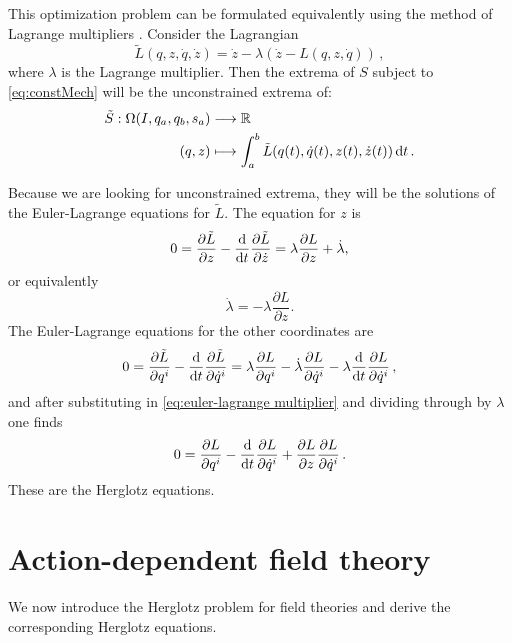 \documentclass[../main.tex]{subfiles}
\begin{document}
This optimization problem can be formulated equivalently using the method of Lagrange multipliers \cite{de_leon_constrained_2021}. Consider the Lagrangian
$$
 \tilde{L}(q,z,\dot q,\dot z)=\dot{z}-\lambda(\dot{z}-L(q,z,\dot q))\,,
$$
where $\lambda$ is the Lagrange multiplier. Then the extrema of \(S\) subject to \cref{eq:constMech} will be the unconstrained extrema of:
\begin{equation}
    \begin{aligned}
        \tilde{S}: \Omega(I,q_a,q_b,s_a) &\longrightarrow \mathbb{R}\\
        (q,z) &\longmapsto \int_a^b \tilde{L}(q(t),\dot{q}(t), z(t),\dot{z}(t)) \,\mathrm{d} t\,.
    \end{aligned}
\end{equation}

Because we are looking for unconstrained extrema, they will be the solutions of the Euler-Lagrange equations for \(\tilde{L}\). The equation for \(z\) is
\begin{equation*}
	0 = \frac{\partial \tilde{L}}{\partial z} - \frac{\mathrm{d}}{\mathrm{d} t} \frac{\partial
	\tilde{L}}{\partial \dot{z}} = \lambda \frac{\partial L}{\partial z} + \dot{\lambda},
\end{equation*}
or equivalently
\begin{equation} \label{eq:euler-lagrange multiplier}
	\dot{\lambda} = -\lambda \frac{\partial L}{\partial z}. 
\end{equation}
The Euler-Lagrange equations for the other coordinates are
\begin{equation*}
	0 = \frac{\partial \tilde{L}}{\partial q^i} - \frac{\mathrm{d}}{\mathrm{d} t} \frac{\partial
	\tilde{L}}{\partial \dot{q}^i} = \lambda \frac{\partial L}{\partial q^i} -
	\dot{\lambda}\frac{\partial L}{\partial \dot{q}^i} - \lambda \frac{\mathrm{d}}{\mathrm{d}
	t}\frac{\partial L}{\partial \dot{q}^i}\,,
\end{equation*}
and after substituting in \cref{eq:euler-lagrange multiplier} and dividing through by \(
\lambda \) one finds
\begin{equation} \label{eq:lagrange multiplier action}
	0 = \frac{\partial L}{\partial q^i} - \frac{\mathrm{d}}{\mathrm{d} t} \frac{\partial L}{\partial
	\dot{q}^i} + \frac{\partial L}{\partial z}\frac{\partial L}{\partial \dot{q}^i}\,.
\end{equation}
These are the Herglotz equations.

\section{Action-dependent field theory}
We now introduce the Herglotz problem for field theories and derive the corresponding Herglotz equations.
\end{document}

